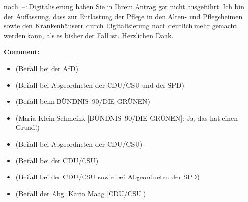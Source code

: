 \documentclass{article}
\begin{document}
noch –: Digitalisierung haben Sie in Ihrem Antrag gar nicht ausgeführt. Ich bin der Auffassung, dass zur Entlastung der Pflege in den Alten- und Pflegeheimen sowie den Krankenhäusern durch Digitalisierung noch deutlich mehr gemacht werden kann, als es bisher der Fall ist. Herzlichen Dank.  

\noindent\textbf{Comment:}
\begin{itemize}
    \setlength\itemsep{-3pt}
    \item (Beifall bei der AfD)
    \setlength\itemsep{-3pt}
    \item (Beifall bei Abgeordneten der CDU/CSU und der SPD)
    \setlength\itemsep{-3pt}
    \item (Beifall beim BÜNDNIS 90/DIE GRÜNEN)
    \setlength\itemsep{-3pt}
    \item (Maria Klein-Schmeink [BÜNDNIS 90/DIE GRÜNEN]: Ja, das hat einen Grund!)
    \setlength\itemsep{-3pt}
    \item (Beifall bei Abgeordneten der CDU/CSU)
    \setlength\itemsep{-3pt}
    \item (Beifall bei der CDU/CSU)
    \setlength\itemsep{-3pt}
    \item (Beifall bei der CDU/CSU sowie bei Abgeordneten der SPD)
    \setlength\itemsep{-3pt}
    \item (Beifall der Abg. Karin Maag [CDU/CSU])
\end{itemize}
\end{document}
